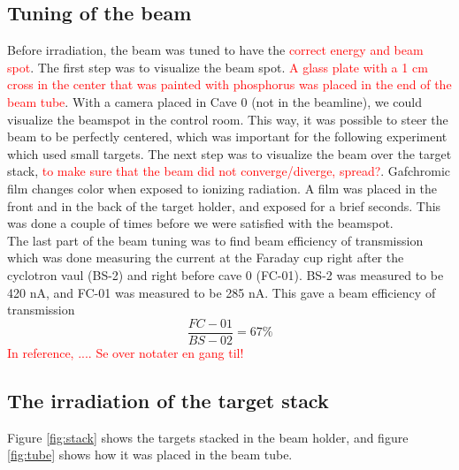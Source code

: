\documentclass[a4paper,11pt,twoside]{book}
\begin{document}
\subsection{Tuning of the beam}
Before irradiation, the beam was tuned to have the \textcolor{red}{correct energy and beam spot}. The first step was to visualize the beam spot. \textcolor{red}{A glass plate with a 1 cm cross in the center that was painted with phosphorus was placed in the end of the beam tube}. With a camera placed in Cave 0 (not in the beamline), we could visualize the beamspot in the control room. This way, it was possible to steer the beam to be perfectly centered, which was important for the following experiment which used small targets. The next step was to visualize the beam over the target stack, \textcolor{red}{to make sure that the beam did not converge/diverge, spread?}. Gafchromic film changes color when exposed to ionizing radiation. A film was placed in the front and in the back of the target holder, and exposed for a brief seconds. This was done a couple of times before we were satisfied with the beamspot. \\

\noindent 
The last part of the beam tuning was to find beam efficiency of transmission which was done measuring the current at the Faraday cup right after the cyclotron vaul (BS-2) and right before cave 0 (FC-01). BS-2 was measured to be 420 nA, and FC-01 was measured to be 285 nA. This gave a beam efficiency of transmission
\begin{equation*}
    \frac{FC-01}{BS-02}=67\%
\end{equation*}
\noindent 
\textcolor{red}{In reference, .... Se over notater en gang til!}

\subsection{The irradiation of the target stack}

Figure \ref{fig:stack} shows the targets stacked in the beam holder, and figure \ref{fig:tube} shows how it was placed in the beam tube. 
\end{document}
